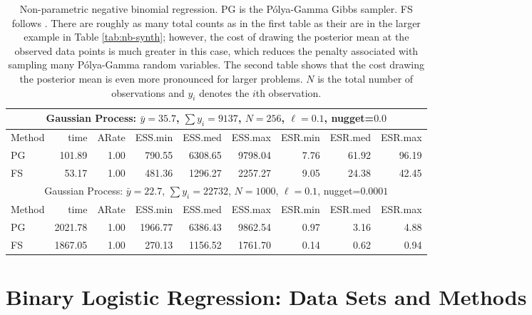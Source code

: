 \documentclass[11pt]{article}
\newcommand{\Polya}{P\'{o}lya}
\newcommand{\tablesize}{\small}
\begin{document}
\begin{table}
\tablesize
\centering
\label{tab:nb-gp-ex01}
\begin{tabular}{l r r r r r r r r } 
\hline
\multicolumn{9}{c}{Gaussian Process: $\bar y = 35.7$, $\sum y_i = 9137$, $N=256$, $\ell=0.1$, nugget=$0.0$} \\
\hline
Method  &     time &    ARate &  ESS.min &  ESS.med &  ESS.max &  ESR.min &  ESR.med &  ESR.max \\ 
    PG  &   101.89 &     1.00 &   790.55 &  6308.65 &  9798.04 &     7.76 &    61.92 &    96.19 \\ 
    FS  &    53.17 &     1.00 &   481.36 &  1296.27 &  2257.27 &     9.05 &    24.38 &    42.45 \\

\hline
\multicolumn{9}{c}{Gaussian Process: $\bar y = 22.7$, $\sum y_i = 22732$, $N=1000$, $\ell=0.1$, nugget=$0.0001$} \\
\hline
Method  &     time &    ARate &  ESS.min &  ESS.med &  ESS.max &  ESR.min &  ESR.med &  ESR.max \\ 
    PG  &  2021.78 &     1.00 &  1966.77 &  6386.43 &  9862.54 &     0.97 &     3.16 &     4.88 \\ 
    FS  &  1867.05 &     1.00 &   270.13 &  1156.52 &  1761.70 &     0.14 &     0.62 &     0.94

 \end{tabular}
 \caption{Non-parametric negative binomial regression.  PG is the \Polya-Gamma Gibbs sampler.  FS follows
   \cite{fruhwirth-schnatter-etal-2009}.  There are roughly as many total counts
   as in the first table as their are in the larger example in Table \ref{tab:nb-synth}; however, the cost of
   drawing the posterior mean at the observed data points is much greater in
   this case, which reduces the penalty associated with sampling many
   \Polya-Gamma random variables.  The second table shows that the cost drawing
   the posterior mean is even more pronounced for larger problems.  $N$ is the
   total number of observations and $y_i$ denotes the $i$th observation.}
\end{table}

\appendix

\section{Binary Logistic Regression: Data Sets and Methods}
\label{sec:blogit-datasets}
\end{document}
